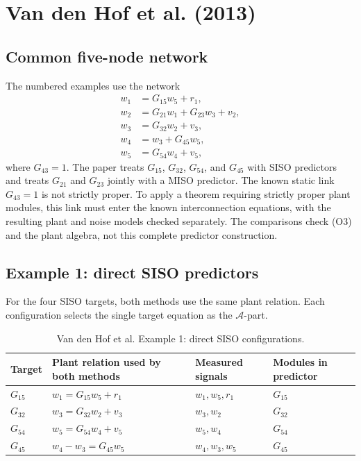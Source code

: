 \documentclass[11pt,a4paper]{article}
\newcommand{\Aset}{\mathcal A}
\begin{document}
\section{Van den Hof et al. (2013)}

\subsection{Common five-node network}

The numbered examples use the network
\begin{align}
  w_1 &= G_{15}w_5+r_1, \label{eq:vdh1}\\
  w_2 &= G_{21}w_1+G_{23}w_3+v_2, \label{eq:vdh2}\\
  w_3 &= G_{32}w_2+v_3, \label{eq:vdh3}\\
  w_4 &= w_3+G_{45}w_5, \label{eq:vdh4}\\
  w_5 &= G_{54}w_4+v_5, \label{eq:vdh5}
\end{align}
where $G_{43}=1$.  The paper treats $G_{15}$, $G_{32}$, $G_{54}$, and $G_{45}$ with SISO predictors and treats $G_{21}$ and $G_{23}$ jointly with a MISO predictor.  The known static link $G_{43}=1$ is not strictly proper.  To apply a theorem requiring strictly proper plant modules, this link must enter the known interconnection equations, with the resulting plant and noise models checked separately.  The comparisons check (O3) and the plant algebra, not this complete predictor construction.

\subsection{Example 1: direct SISO predictors}

For the four SISO targets, both methods use the same plant relation.  Each configuration selects the single target equation as the $\Aset$-part.

\begin{table}[htbp]
\centering
\caption{Van den Hof et al. Example 1: direct SISO configurations.}
\label{tab:vdh-siso}
\begin{tabularx}{\textwidth}{@{}lX X X@{}}
\toprule
Target & Plant relation used by both methods & Measured signals & Modules in predictor \\
\midrule
$G_{15}$ & $w_1=G_{15}w_5+r_1$ & $w_1,w_5,r_1$ & $G_{15}$ \\
$G_{32}$ & $w_3=G_{32}w_2+v_3$ & $w_3,w_2$ & $G_{32}$ \\
$G_{54}$ & $w_5=G_{54}w_4+v_5$ & $w_5,w_4$ & $G_{54}$ \\
$G_{45}$ & $w_4-w_3=G_{45}w_5$ & $w_4,w_3,w_5$ & $G_{45}$ \\
\bottomrule
\end{tabularx}
\end{table}
\end{document}

